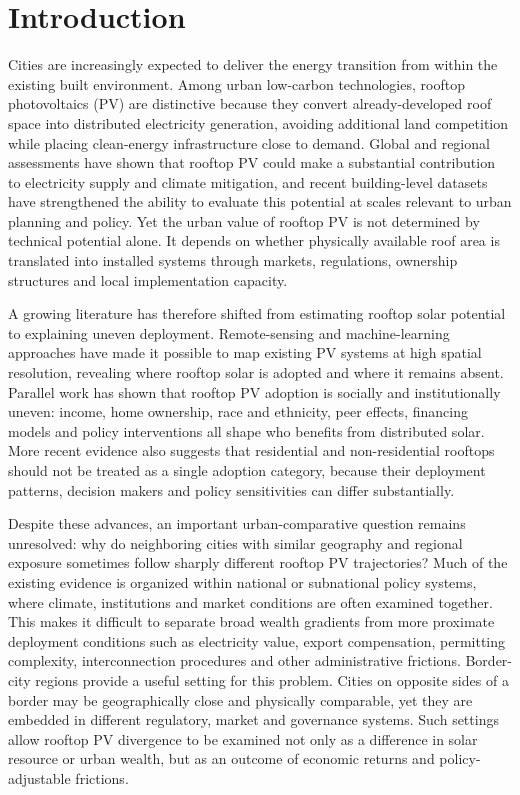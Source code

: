 \documentclass[pdflatex,sn-nature]{sn-jnl}
\begin{document}

\section{Introduction}

Cities are increasingly expected to deliver the energy transition from within the existing built environment. Among urban low-carbon technologies, rooftop photovoltaics (PV) are distinctive because they convert already-developed roof space into distributed electricity generation, avoiding additional land competition while placing clean-energy infrastructure close to demand. Global and regional assessments have shown that rooftop PV could make a substantial contribution to electricity supply and climate mitigation, and recent building-level datasets have strengthened the ability to evaluate this potential at scales relevant to urban planning and policy. \cite{RN1,RN2,RN3,RN7,RN31} Yet the urban value of rooftop PV is not determined by technical potential alone. It depends on whether physically available roof area is translated into installed systems through markets, regulations, ownership structures and local implementation capacity. \cite{RN4,RN5,RN6}

A growing literature has therefore shifted from estimating rooftop solar potential to explaining uneven deployment. Remote-sensing and machine-learning approaches have made it possible to map existing PV systems at high spatial resolution, revealing where rooftop solar is adopted and where it remains absent. \cite{RN8,RN9,RN10,RN11,RN28,RN29} Parallel work has shown that rooftop PV adoption is socially and institutionally uneven: income, home ownership, race and ethnicity, peer effects, financing models and policy interventions all shape who benefits from distributed solar. \cite{RN12,RN13,RN15,RN16,RN17,RN21,RN22,RN23} More recent evidence also suggests that residential and non-residential rooftops should not be treated as a single adoption category, because their deployment patterns, decision makers and policy sensitivities can differ substantially. \cite{RN18,RN19,RN20}

Despite these advances, an important urban-comparative question remains unresolved: why do neighboring cities with similar geography and regional exposure sometimes follow sharply different rooftop PV trajectories? Much of the existing evidence is organized within national or subnational policy systems, where climate, institutions and market conditions are often examined together. This makes it difficult to separate broad wealth gradients from more proximate deployment conditions such as electricity value, export compensation, permitting complexity, interconnection procedures and other administrative frictions. Border-city regions provide a useful setting for this problem. Cities on opposite sides of a border may be geographically close and physically comparable, yet they are embedded in different regulatory, market and governance systems. Such settings allow rooftop PV divergence to be examined not only as a difference in solar resource or urban wealth, but as an outcome of economic returns and policy-adjustable frictions.
\end{document}
